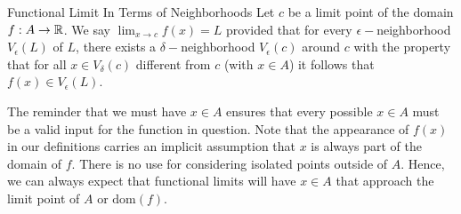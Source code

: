 \begin{definition}{Functional Limit In Terms of Neighborhoods}{}
    Let \( c  \) be a limit point of the domain \( f: A \to \mathbb{R}  \). We say \( \lim_{ x \to c } f(x) = L  \) provided that for every \( \epsilon - \)neighborhood \( V_{\epsilon }(L)  \) of \( L \), there exists a \( \delta- \)neighborhood \( V_{\epsilon }(c) \) around \( c \) with the property that for all \( x \in V_{\delta}(c) \) different from \( c  \) (with \( x \in A  \)) it follows that \( f(x) \in V_{\epsilon }(L) \).
\end{definition}

The reminder that we must have \( x \in A   \) ensures that every possible \( x \in A  \) must be a valid input for the function in question. Note that the appearance of \( f(x) \) in our definitions carries an implicit assumption that \( x  \) is always part of the domain of \( f \). There is no use for considering isolated points outside of \( A  \). Hence, we can always expect that functional limits will have \( x \in A  \) that approach the limit point of \( A  \) or \( \text{dom}(f) \).

